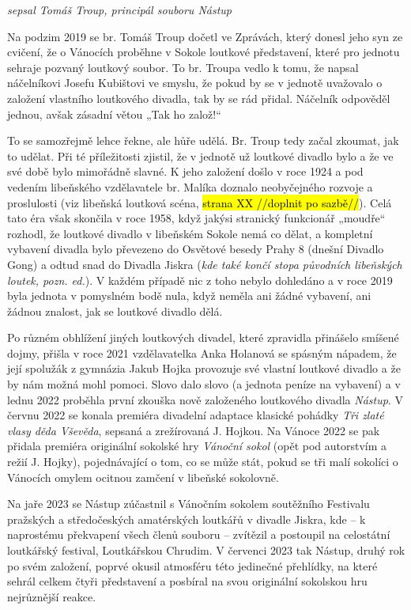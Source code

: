 \emph{sepsal Tomáš Troup, principál souboru Nástup}

Na podzim 2019 se br. Tomáš Troup dočetl ve Zprávách, který donesl jeho
syn ze cvičení, že o Vánocích proběhne v Sokole loutkové představení,
které pro jednotu sehraje pozvaný loutkový soubor. To br. Troupa vedlo k
tomu, že napsal náčelníkovi Josefu Kubištovi ve smyslu, že pokud by se v
jednotě uvažovalo o založení vlastního loutkového divadla, tak by se rád
přidal. Náčelník odpověděl jednou, avšak zásadní větou „Tak ho
založ!{}``

To se samozřejmě lehce řekne, ale hůře udělá. Br. Troup tedy začal
zkoumat, jak to udělat. Při té příležitosti zjistil, že v jednotě už
loutkové divadlo bylo a že ve své době bylo mimořádně slavné. K jeho
založení došlo v roce 1924 a pod vedením libeňského vzdělavatele br.
Malíka doznalo neobyčejného rozvoje a proslulosti (viz libeňská loutková
scéna, \hl{strana XX //doplnit po sazbě//}). Celá tato éra však skončila
v roce 1958, když jakýsi stranický funkcionář „moudře`` rozhodl, že
loutkové divadlo v libeňském Sokole nemá co dělat, a kompletní vybavení
divadla bylo převezeno do Osvětové besedy Prahy 8 (dnešní Divadlo Gong)
a odtud snad do Divadla Jiskra (\emph{kde také končí stopa původních
libeňských loutek, pozn. ed.}). V každém případě nic z toho nebylo
dohledáno a v roce 2019 byla jednota v pomyslném bodě nula, když neměla
ani žádné vybavení, ani žádnou znalost, jak se loutkové divadlo dělá.

Po různém obhlížení jiných loutkových divadel, které zpravidla přinášelo
smíšené dojmy, přišla v roce 2021 vzdělavatelka Anka Holanová se spásným
nápadem, že její spolužák z gymnázia Jakub Hojka provozuje své vlastní
loutkové divadlo a že by nám možná mohl pomoci. Slovo dalo slovo (a
jednota peníze na vybavení) a v lednu 2022 proběhla první zkouška nově
založeného loutkového divadla \emph{Nástup}. V červnu 2022 se konala
premiéra divadelní adaptace klasické pohádky \emph{Tři zlaté vlasy děda
Vševěda}, sepsaná a zrežírovaná J. Hojkou. Na Vánoce 2022 se pak přidala
premiéra originální sokolské hry \emph{Vánoční sokol} (opět pod
autorstvím a režií J. Hojky), pojednávající o tom, co se může stát,
pokud se tři malí sokolíci o Vánocích omylem ocitnou zamčení v libeňské
sokolovně.

Na jaře 2023 se Nástup zúčastnil s Vánočním sokolem soutěžního Festivalu
pražských a středočeských amatérských loutkářů v divadle Jiskra, kde --
k naprostému překvapení všech členů souboru -- zvítězil a postoupil na
celostátní loutkářský festival, Loutkářskou Chrudim. V červenci 2023 tak
Nástup, druhý rok po svém založení, poprvé okusil atmosféru této
jedinečné přehlídky, na které sehrál celkem čtyři představení a posbíral
na svou originální sokolskou hru nejrůznější reakce.

